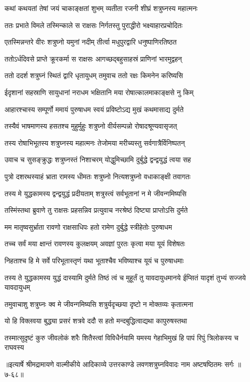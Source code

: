 
\twolineshloka
{कथां कथयतां तेषां जयं चाकाङ्क्षतां शुभम्}
{व्यतीता रजनी शीघ्रं शत्रुघ्नस्य महात्मनः} %

\twolineshloka
{ततः प्रभाते विमले तस्मिन्काले स राक्षसः}
{निर्गतस्तु पुराद्धीरो भक्ष्याहारप्रचोदितः} %

\twolineshloka
{एतस्मिन्नन्तरे वीरः शत्रुघ्नो यमुनां नदीम्}
{तीर्त्वा मधुपुरद्वारि धनुष्पाणिरतिष्ठत} %

\twolineshloka
{ततोऽर्धदिवसे प्राप्ते क्रूरकर्मा स राक्षसः}
{आगच्छद्बहुसाहस्रं प्राणिनां भारमुद्वहन्} %

\twolineshloka
{ततो ददर्श शत्रुघ्नं स्थितं द्वारि धृतायुधम्}
{तमुवाच ततो रक्षः किमनेन करिष्यसि} %

\twolineshloka
{ईदृशानां सहस्राणि सायुधानां नराधम}
{भक्षितानि मया रोषात्कालमाकाङ्क्षसे नु किम्} %

\twolineshloka
{आहारश्चास्य सम्पूर्णो ममायं पुरुषाधम}
{स्वयं प्रविष्टोऽद्य मुखं कथमासाद्य दुर्मते} %

\twolineshloka
{तस्यैवं भाषमाणस्य हसतश्च मुहुर्मुहुः}
{शत्रुघ्नो वीर्यसम्पन्नो रोषादश्रूण्यवासृजत्} %

\twolineshloka
{तस्य रोषाभिभूतस्य शत्रुघ्नस्य महात्मनः}
{तेजोमया मरीच्यस्तु सर्वगात्रैर्विनिष्पतन्} %

\twolineshloka
{उवाच च सुसङ्क्रुद्धः शत्रुघ्नस्तं निशाचरम्}
{योद्धुमिच्छामि दुर्बुद्धे द्वन्द्वयुद्धं त्वया सह} %

\twolineshloka
{पुत्रो दशरथस्याहं भ्राता रामस्य धीमतः}
{शत्रुघ्नो नित्यशत्रुघ्नो वधाकाङ्क्षी तवागतः} %

\twolineshloka
{तस्य मे युद्धकामस्य द्वन्द्वयुद्धं प्रदीयताम्}
{शत्रुस्त्वं सर्वभूतानां न मे जीवन्गमिष्यसि} %

\twolineshloka
{तस्मिंस्तथा ब्रुवाणे तु राक्षसः प्रहसन्निव}
{प्रत्युवाच नरश्रेष्ठं दिष्ट्या प्राप्तोऽसि दुर्मते} %

\twolineshloka
{मम मातृष्वसुर्भ्राता रावणो राक्षसाधिपः}
{हतो रामेण दुर्बुद्धे स्त्रीहेतोः पुरुषाधम} %

\twolineshloka
{तच्च सर्वं मया क्षान्तं रावणस्य कुलक्षयम्}
{अवज्ञां पुरतः कृत्वा मया यूयं विशेषतः} %

\twolineshloka
{निहताश्च हि मे सर्वे परिभूतास्तृणं यथा}
{भूताश्चैव भविष्याश्च यूयं च पुरुषाधमाः} %

\threelineshloka
{तस्य ते युद्धकामस्य युद्धं दास्यामि दुर्मते}
{तिष्ठं त्वं च मुहूर्तं तु यावदायुधमानये}
{ईप्सितं यादृशं तुभ्यं सज्जये यावदायुधम्} %

\twolineshloka
{तमुवाचाशु शत्रुघ्नः क्व मे जीवन्गमिष्यसि}
{शत्रुर्यदृच्छया दृष्टो न मोक्तव्यः कृतात्मना} %

\twolineshloka
{यो हि विक्लवया बुद्ध्या प्रसरं शत्रवे ददौ}
{स हतो मन्दबुद्धित्वाद्यथा कापुरुषस्तथा} %

\twolineshloka
{तस्मात्सुदृष्टं कुरु जीवलोकं शरैः शितैस्त्वां विविधैर्नयामि}
{यमस्य गेहाभिमुखं हि पापं रिपुं त्रिलोकस्य च राघवस्य} %


॥इत्यार्षे श्रीमद्रामायणे वाल्मीकीये आदिकाव्ये उत्तरकाण्डे लवणशत्रुघ्नविवादः नाम अष्टषष्ठितमः सर्गः ॥७-६८॥
